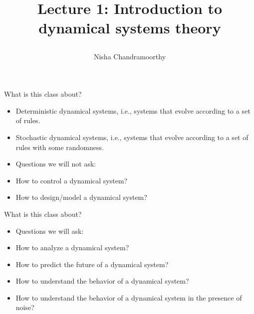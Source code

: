 \documentclass[final]{beamer}
\title{\begin{huge}{Lecture 1: Introduction to dynamical systems theory}\end{huge}} %
\author{Nisha Chandramoorthy} %
\begin{document}
\frame{\titlepage}

\begin{frame}{What is this class about?}
	\begin{itemize}
	\item Deterministic dynamical systems, i.e., systems that evolve according to a set of rules.
	\pause 
	\item Stochastic dynamical systems, i.e., systems that evolve according to a set of rules with some randomness.
	\pause
\item Questions we will not ask:
	\pause 
	\item How to control a dynamical system?
	\item How to design/model a dynamical system?
	\end{itemize}
\end{frame}
\begin{frame}{What is this class about?}
	\begin{itemize}
		\item Questions we will ask:
		\pause
		\item How to analyze a dynamical system?
		\pause
		\item How to predict the future of a dynamical system?
		\pause
		\item How to understand the behavior of a dynamical system?
		\pause
		\item How to understand the behavior of a dynamical system in the presence of noise?
	\end{itemize}

\end{frame}
\end{document}
